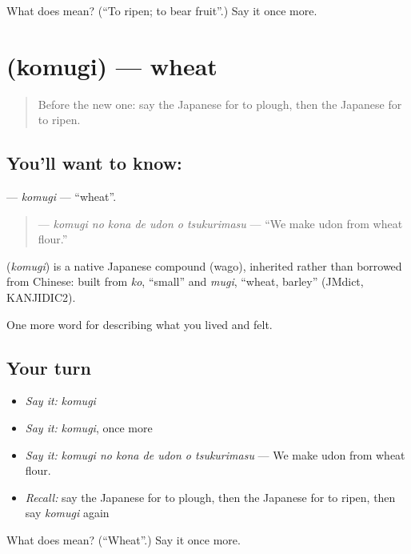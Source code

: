 \begin{tcolorbox}[breakable,colback=teal!4,colframe=teal!35!black,title={Before you move on}]
What does  mean? (\textquotedblleft{}To ripen; to bear fruit\textquotedblright{}.) Say it once more.
\end{tcolorbox}
\section[\texorpdfstring{\ja{こむぎ} (komugi)}{こむぎ (komugi)}]{ (komugi) — wheat}

\label{lesson:JA-C489-komugi}



\begin{quote}
Before the new one: say the Japanese for to plough, then the Japanese for to ripen.
\end{quote}

\subsection*{You'll want to know: }
\textbf{} — \emph{komugi} — \textquotedblleft{}wheat\textquotedblright{}.

\begin{quote}
\textbf{   } — \emph{komugi no kona de udon o tsukurimasu} — \textquotedblleft{}We make udon from wheat flour.\textquotedblright{}
\end{quote}

\begin{cousinweb}
\textbf{} (\emph{komugi}) is a native Japanese compound (wago), inherited rather than borrowed from Chinese: built from \emph{ko}, \textquotedblleft{}small\textquotedblright{} and \emph{mugi}, \textquotedblleft{}wheat, barley\textquotedblright{} (JMdict, KANJIDIC2).
\end{cousinweb}

\begin{grammarlens}[title={What you've built}]
One more word for describing what you lived and felt.
\end{grammarlens}

\subsection*{Your turn}
\begin{itemize}
\raggedright
  \item \emph{Say it:} \emph{komugi}
  \item \emph{Say it:} \emph{komugi}, once more
  \item \emph{Say it:} \emph{komugi no kona de udon o tsukurimasu} — We make udon from wheat flour.
  \item \emph{Recall:} say the Japanese for to plough, then the Japanese for to ripen, then say \emph{komugi} again
\end{itemize}

\begin{tcolorbox}[breakable,colback=teal!4,colframe=teal!35!black,title={Before you move on}]
What does  mean? (\textquotedblleft{}Wheat\textquotedblright{}.) Say it once more.
\end{tcolorbox}
